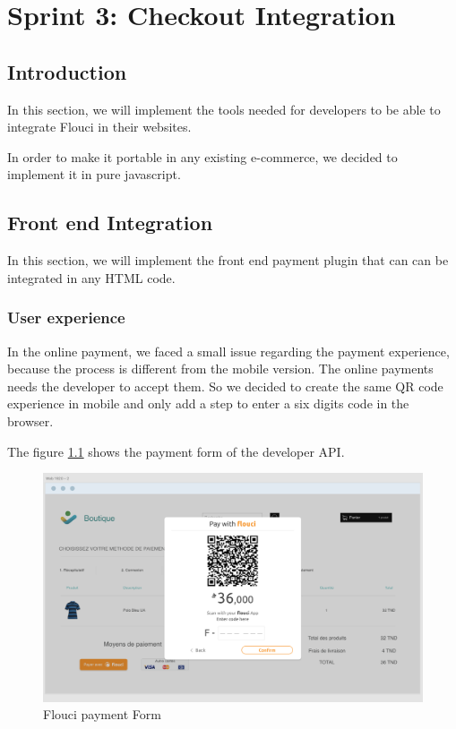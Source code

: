
\setcounter{chapter}{4}
\chapter{Sprint 3: Checkout Integration}
\minitoc %
\graphicspath{{Chapter5/figures/}}

\pagestyle{fancy}
\fancyhf{}
\fancyhead[R]{\bfseries\rightmark}
\fancyfoot[R]{\thepage}
\renewcommand{\headrulewidth}{0.5pt}
\renewcommand{\footrulewidth}{0pt}
\renewcommand{\chaptermark}[1]{\markboth{\MakeUppercase{\chaptername~\thechapter. #1 }}{}}
\renewcommand{\sectionmark}[1]{\markright{\thechapter.\thesection~ #1}}


\begin{spacing}{1.2}

\section*{Introduction}
In this section, we will implement the tools needed for developers to be able to integrate Flouci in their websites. 

In order to make it portable in any existing e-commerce, we decided to implement it in pure javascript.
\section{Front end Integration}
In this section, we will implement the front end payment plugin that can can be integrated in any HTML code.
\subsection{User experience}
In the online payment, we faced a small issue regarding the payment experience, because the process is different from the mobile version. The online payments needs the developer to accept them.
So we decided to create the same QR code experience in mobile and only add a step to enter a six digits code in the browser.

The figure \ref{fig:onlinepay} shows the payment form of the developer API.
\begin{figure}[H]\centering
\includegraphics[width= \textwidth, keepaspectratio ]{Checkout_screen.png}
\caption{Flouci payment Form}
\label{fig:onlinepay}
\end{figure}


\end{spacing}
